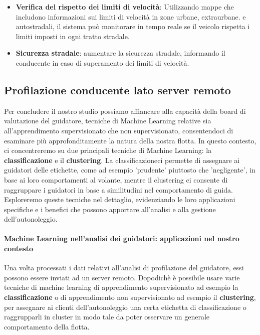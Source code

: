 \documentclass[12pt, a4paper, italian]{report}
\numberwithin{figure}{chapter}
\numberwithin{table}{chapter}
\begin{document}
\begin{itemize}
    \item \textbf{Verifica del rispetto dei limiti di velocità}: Utilizzando mappe che includono informazioni sui limiti di velocità in zone urbane, extraurbane. e autostradali, il sistema può monitorare in tempo reale se il veicolo rispetta i limiti imposti in ogni tratto stradale.
    \item \textbf{Sicurezza stradale}: aumentare la sicurezza stradale, informando il conducente in caso di superamento dei limiti di velocità. 
\end{itemize}

\subsection{Profilazione conducente lato server remoto} 
Per concludere il nostro studio possiamo affiancare alla capacità della board di valutazione del guidatore, tecniche di Machine Learning relative sia all'apprendimento supervisionato che non supervisionato, consentendoci di esaminare più approfonditamente la natura della nostra flotta. In questo contesto, ci concentreremo su due principali tecniche di Machine Learning: la \textbf{classificazione} e il \textbf{clustering}. La classificazioneci permette di assegnare ai guidatori delle etichette, come ad esempio 'prudente' piuttosto che 'negligente', in base ai loro comportamenti al volante, mentre il clustering ci consente di raggruppare i guidatori in base a similitudini nel comportamento di guida. Esploreremo queste tecniche nel dettaglio, evidenziando le loro applicazioni specifiche e i benefici che possono apportare all'analisi e alla gestione dell'autonoleggio. \cite{wiki:Apprendimento_automatico}

\vspace{0.5cm}
\paragraph{Machine Learning nell'analisi dei guidatori: applicazioni nel nostro contesto}
Una volta processati i dati relativi all'analisi di profilazione del guidatore, essi possono essere inviati ad un server remoto. Dopodichè è possibile usare varie tecniche di machine learning di apprendimento supervisionato ad esempio la \textbf{classificazione} o di apprendimento non supervisionato ad esempio il \textbf{clustering}, per assegnare ai clienti dell'autonoleggio una certa etichetta di classificazione o raggrupparli in cluster in modo tale da poter osservare un generale comportamento della flotta.
\end{document}
